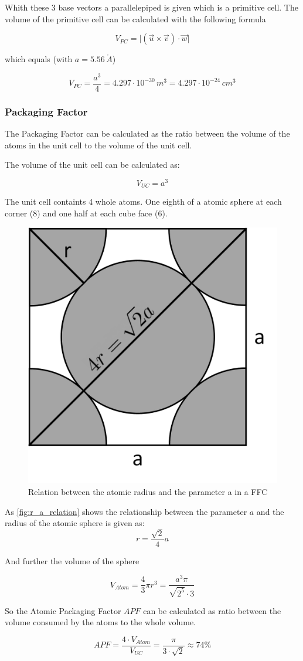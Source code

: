 Whith these 3 base vectors a parallelepiped is given which is a primitive cell.
The volume of the primitive cell can be calculated with the following formula

$$V_{PC} = \vert (\vec{u} \times \vec{v})  \cdot \vec{w} \vert$$

which equals (with $a = 5.56 \, \mathring{A}$)

$$V_{PC} = \frac{a^3}{4} = 4.297 \cdot 10^{-30} \,m^3 = 4.297 \cdot 10^{-24} \,cm^3$$
\subsubsection*{Packaging Factor}

The Packaging Factor can be calculated as the ratio between the
volume of the atoms in the unit cell to the volume of the unit cell.

The volume of the unit cell can be calculated as:

$$V_{UC} = a^3$$


The unit cell containts 4 whole atoms.
One eighth of a atomic sphere at each corner (8) and one half at 
each cube face (6).

\begin{figure}[H]
	\centering
	\includegraphics[width=0.3\linewidth]{Graphics/Chapter1/r_a_relation}
	\caption{Relation between the atomic radius and the parameter a in a FFC}
	\label{fig:r_a_relation}
\end{figure}

 As \autoref{fig:r_a_relation} shows the relationship between the parameter $a$ and the radius of the atomic sphere is given as:
$$r = \frac{\sqrt{2}}{4} a $$

And further the volume of the sphere

$$V_{Atom} = \frac{4}{3} \pi r^3 = \frac{a^3 \pi}{\sqrt{2^5}\cdot 3}$$

So the Atomic Packaging Factor $APF$ can be calculated as ratio between the
volume consumed by the atoms to the whole volume.

$$APF = \frac{4 \cdot V_{Atom} }{V_{UC}} = \frac{\pi}{3 \cdot \sqrt{2}} \approx 74\%$$


